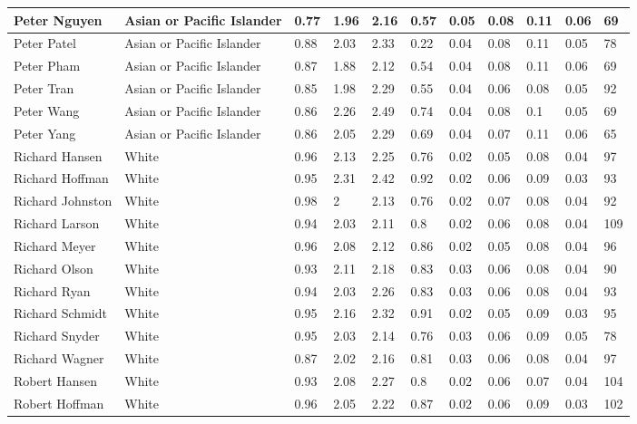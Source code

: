 \begin{table}[!ht]
\begin{tabular}{|l|l|l|l|l|l|l|l|l|l|l|}
        Peter Nguyen & Asian or Pacific Islander & 0.77 & 1.96 & 2.16 & 0.57 & 0.05 & 0.08 & 0.11 & 0.06 & 69 \\ \hline
        Peter Patel & Asian or Pacific Islander & 0.88 & 2.03 & 2.33 & 0.22 & 0.04 & 0.08 & 0.11 & 0.05 & 78 \\ \hline
        Peter Pham & Asian or Pacific Islander & 0.87 & 1.88 & 2.12 & 0.54 & 0.04 & 0.08 & 0.11 & 0.06 & 69 \\ \hline
        Peter Tran & Asian or Pacific Islander & 0.85 & 1.98 & 2.29 & 0.55 & 0.04 & 0.06 & 0.08 & 0.05 & 92 \\ \hline
        Peter Wang & Asian or Pacific Islander & 0.86 & 2.26 & 2.49 & 0.74 & 0.04 & 0.08 & 0.1 & 0.05 & 69 \\ \hline
        Peter Yang & Asian or Pacific Islander & 0.86 & 2.05 & 2.29 & 0.69 & 0.04 & 0.07 & 0.11 & 0.06 & 65 \\ \hline
        Richard Hansen & White & 0.96 & 2.13 & 2.25 & 0.76 & 0.02 & 0.05 & 0.08 & 0.04 & 97 \\ \hline
        Richard Hoffman & White & 0.95 & 2.31 & 2.42 & 0.92 & 0.02 & 0.06 & 0.09 & 0.03 & 93 \\ \hline
        Richard Johnston & White & 0.98 & 2 & 2.13 & 0.76 & 0.02 & 0.07 & 0.08 & 0.04 & 92 \\ \hline
        Richard Larson & White & 0.94 & 2.03 & 2.11 & 0.8 & 0.02 & 0.06 & 0.08 & 0.04 & 109 \\ \hline
        Richard Meyer & White & 0.96 & 2.08 & 2.12 & 0.86 & 0.02 & 0.05 & 0.08 & 0.04 & 96 \\ \hline
        Richard Olson & White & 0.93 & 2.11 & 2.18 & 0.83 & 0.03 & 0.06 & 0.08 & 0.04 & 90 \\ \hline
        Richard Ryan & White & 0.94 & 2.03 & 2.26 & 0.83 & 0.03 & 0.06 & 0.08 & 0.04 & 93 \\ \hline
        Richard Schmidt & White & 0.95 & 2.16 & 2.32 & 0.91 & 0.02 & 0.05 & 0.09 & 0.03 & 95 \\ \hline
        Richard Snyder & White & 0.95 & 2.03 & 2.14 & 0.76 & 0.03 & 0.06 & 0.09 & 0.05 & 78 \\ \hline
        Richard Wagner & White & 0.87 & 2.02 & 2.16 & 0.81 & 0.03 & 0.06 & 0.08 & 0.04 & 97 \\ \hline
        Robert Hansen & White & 0.93 & 2.08 & 2.27 & 0.8 & 0.02 & 0.06 & 0.07 & 0.04 & 104 \\ \hline
        Robert Hoffman & White & 0.96 & 2.05 & 2.22 & 0.87 & 0.02 & 0.06 & 0.09 & 0.03 & 102 \\ \hline

\end{tabular}
\end{table}

